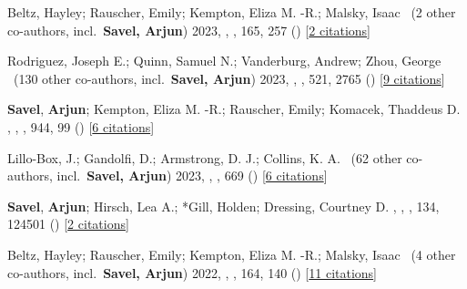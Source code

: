\item[{\color{numcolor}\scriptsize22}] Beltz, Hayley; Rauscher, Emily; Kempton, Eliza M. -R.; Malsky, Isaac \etal\ ({2} other co-authors, incl.\ \textbf{Savel, Arjun}) 2023, , \aj, {165}, 257 () [\href{https://ui.adsabs.harvard.edu/abs/2023AJ....165..257B}{2 citations}]

\item[{\color{numcolor}\scriptsize21}] Rodriguez, Joseph E.; Quinn, Samuel N.; Vanderburg, Andrew; Zhou, George \etal\ ({130} other co-authors, incl.\ \textbf{Savel, Arjun}) 2023, , \mnras, {521}, 2765 () [\href{https://ui.adsabs.harvard.edu/abs/2023MNRAS.521.2765R}{9 citations}]

\item[{\color{numcolor}\scriptsize20}] \textbf{Savel}, \textbf{Arjun}; Kempton, Eliza M. -R.; Rauscher, Emily; Komacek, Thaddeus D. , , \apj, {944}, 99 () [\href{https://ui.adsabs.harvard.edu/abs/2023ApJ...944...99S}{6 citations}]

\item[{\color{numcolor}\scriptsize19}] Lillo-Box, J.; Gandolfi, D.; Armstrong, D. J.; Collins, K. A. \etal\ ({62} other co-authors, incl.\ \textbf{Savel, Arjun}) 2023, , \aanda, {669} () [\href{https://ui.adsabs.harvard.edu/abs/2023A&A...669A.109L}{6 citations}]

\item[{\color{numcolor}\scriptsize18}] \textbf{Savel}, \textbf{Arjun}; Hirsch, Lea A.; *Gill, Holden; Dressing, Courtney D. , , \pasp, {134}, 124501 () [\href{https://ui.adsabs.harvard.edu/abs/2022PASP..134l4501S}{2 citations}]

\item[{\color{numcolor}\scriptsize17}] Beltz, Hayley; Rauscher, Emily; Kempton, Eliza M. -R.; Malsky, Isaac \etal\ ({4} other co-authors, incl.\ \textbf{Savel, Arjun}) 2022, , \aj, {164}, 140 () [\href{https://ui.adsabs.harvard.edu/abs/2022AJ....164..140B}{11 citations}]

